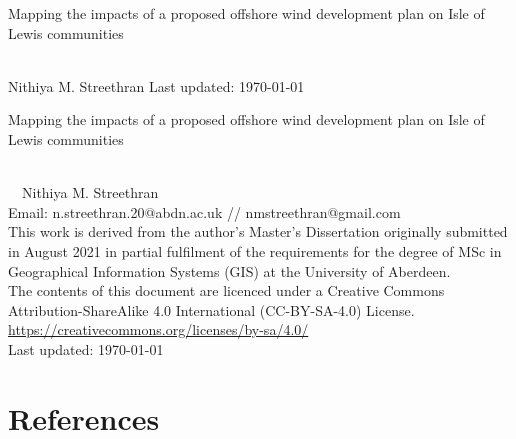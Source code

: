 \documentclass[twoside,12pt,openany]{book}
\def\theauthor{Nithiya M. Streethran}
\def\thetitle{%
  Mapping the impacts of a proposed offshore wind development plan on
  Isle of Lewis communities%
}
\begin{document}

\frontmatter

\begin{titlepage}
  \hspace{0pt}\vfill %
  \centering %
  \Large\thetitle
  \\[4cm]
  \large\theauthor \vfill
  Last updated: \today
  \vfill\hspace{0pt} %
\end{titlepage}

{%
  \setlength{\parindent}{0pt}
  \hspace{0pt}\vfill
  \thetitle
  \\[.5cm]
  \textcopyright~\the\year{}~\theauthor
  \\[.5cm]
  Email: n.streethran.20@abdn.ac.uk // nmstreethran@gmail.com
  \\[.5cm]
  This work is derived from the author's Master's Dissertation originally
  submitted in August 2021 in partial fulfilment of the requirements for the
  degree of MSc in Geographical Information Systems (GIS) at the University of
  Aberdeen.
  \\[.5cm]
  The contents of this document are licenced under a Creative Commons
  Attribution-ShareAlike 4.0 International (CC-BY-SA-4.0) License. \\
  \url{https://creativecommons.org/licenses/by-sa/4.0/}
  \\[.5cm]
  Last updated: \today
  \vfill\hspace{0pt}
}

\doublespacing



\tableofcontents
\listoffigures
\listoftables
\printglossaries



\themainmatter








{%
  \backmatter%
  \chapter{References}%
  \printbibliography[category=cited,heading=none]%
}

\nocite{*}
\theappendix


\end{document}
